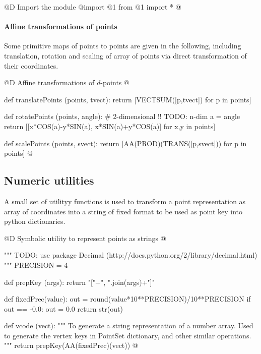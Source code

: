 \documentclass[11pt,oneside]{article}	%
\begin{document}
@D Import the module
@{import @1
from @1 import *
@}

\paragraph{Affine transformations of points} Some primitive maps of points to points are given in the following, including translation, rotation and scaling of array of points via direct transformation of their coordinates.

@D Affine transformations of $d$-points
@{def translatePoints (points, tvect):
	return [VECTSUM([p,tvect]) for p in points]

def rotatePoints (points, angle):		# 2-dimensional !! TODO: n-dim
	a = angle
	return [[x*COS(a)-y*SIN(a), x*SIN(a)+y*COS(a)] for x,y in points]

def scalePoints (points, svect):
	return [AA(PROD)(TRANS([p,svect])) for p in points]
@}

\subsection{Numeric utilities}

A small set of utilityy functions is used to transform a point representation as array of coordinates into a string of fixed format to be used as point key into python dictionaries.

@D Symbolic utility to represent points as strings
@{""" TODO: use package Decimal (http://docs.python.org/2/library/decimal.html) """
PRECISION = 4 

def prepKey (args): return "["+", ".join(args)+"]"

def fixedPrec(value):
	out = round(value*10**PRECISION)/10**PRECISION
	if out == -0.0: out = 0.0
	return str(out)
	
def vcode (vect): 
	"""
	To generate a string representation of a number array.
	Used to generate the vertex keys in PointSet dictionary, and other similar operations.
	"""
	return prepKey(AA(fixedPrec)(vect))
@}






\end{document}
